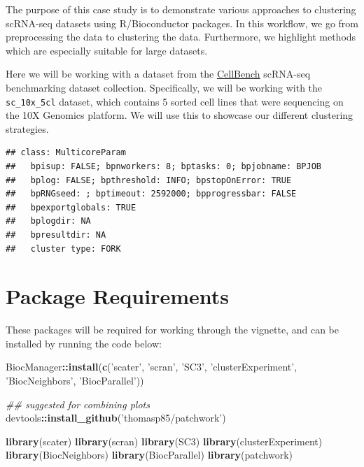 \documentclass[]{book}
\newenvironment{Shaded}{\begin{snugshade}}{\end{snugshade}}
\newcommand{\CommentTok}[1]{\textcolor[rgb]{0.56,0.35,0.01}{\textit{#1}}}
\newcommand{\KeywordTok}[1]{\textcolor[rgb]{0.13,0.29,0.53}{\textbf{#1}}}
\newcommand{\NormalTok}[1]{#1}
\newcommand{\OperatorTok}[1]{\textcolor[rgb]{0.81,0.36,0.00}{\textbf{#1}}}
\newcommand{\StringTok}[1]{\textcolor[rgb]{0.31,0.60,0.02}{#1}}
\begin{document}
The purpose of this case study is to demonstrate various approaches to clustering scRNA-seq datasets using R/Bioconductor packages. In this workflow, we go from preprocessing the data to clustering the data. Furthermore, we highlight methods which are especially suitable for large datasets.

Here we will be working with a dataset from the \href{https://github.com/LuyiTian/CellBench_data}{CellBench} scRNA-seq benchmarking dataset collection. Specifically, we will be working with the \texttt{sc\_10x\_5cl} dataset, which contains 5 sorted cell lines that were sequencing on the 10X Genomics platform. We will use this to showcase our different clustering strategies.

\begin{verbatim}
## class: MulticoreParam
##   bpisup: FALSE; bpnworkers: 8; bptasks: 0; bpjobname: BPJOB
##   bplog: FALSE; bpthreshold: INFO; bpstopOnError: TRUE
##   bpRNGseed: ; bptimeout: 2592000; bpprogressbar: FALSE
##   bpexportglobals: TRUE
##   bplogdir: NA
##   bpresultdir: NA
##   cluster type: FORK
\end{verbatim}

\hypertarget{package-requirements-1}{%
\section{Package Requirements}\label{package-requirements-1}}

These packages will be required for working through the vignette, and can be installed by running the code below:

\begin{Shaded}
\begin{Highlighting}[]
\NormalTok{BiocManager}\OperatorTok{::}\KeywordTok{install}\NormalTok{(}\KeywordTok{c}\NormalTok{(}\StringTok{'scater'}\NormalTok{, }\StringTok{'scran'}\NormalTok{,}
                      \StringTok{'SC3'}\NormalTok{, }\StringTok{'clusterExperiment'}\NormalTok{, }\StringTok{'BiocNeighbors'}\NormalTok{,}
                      \StringTok{'BiocParallel'}\NormalTok{))}

\CommentTok{## suggested for combining plots}
\NormalTok{devtools}\OperatorTok{::}\KeywordTok{install_github}\NormalTok{(}\StringTok{'thomasp85/patchwork'}\NormalTok{)}
\end{Highlighting}
\end{Shaded}

\begin{Shaded}
\begin{Highlighting}[]
\KeywordTok{library}\NormalTok{(scater)}
\KeywordTok{library}\NormalTok{(scran)}
\KeywordTok{library}\NormalTok{(SC3)}
\KeywordTok{library}\NormalTok{(clusterExperiment)}
\KeywordTok{library}\NormalTok{(BiocNeighbors)}
\KeywordTok{library}\NormalTok{(BiocParallel)}
\KeywordTok{library}\NormalTok{(patchwork)}
\end{Highlighting}
\end{Shaded}
\end{document}
